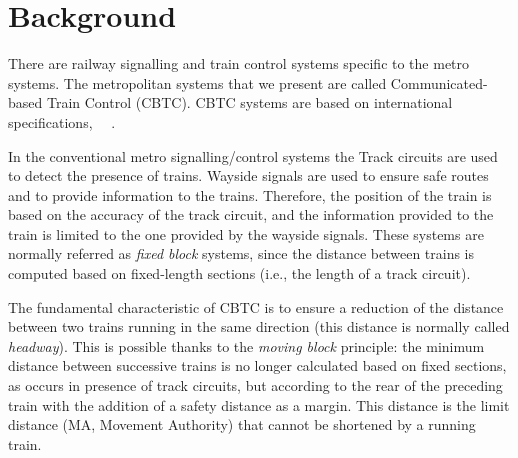 \documentclass{ewic}
\begin{document}
			\section{Background}\label{sec:back}
			
			There are railway signalling and train control systems specific to the metro systems. The metropolitan systems that we present are called Communicated-based Train Control (CBTC). CBTC systems are based on international specifications,~\cite{ieee1474} ~\cite{cei2007}.
			
			In the conventional metro signalling/control systems the Track circuits are used to detect the presence of trains. Wayside signals are used to ensure safe routes and to provide information to the trains. Therefore, the position of the train is based on the accuracy of the track circuit, and the information provided to the train is limited to the one provided by the wayside signals. These systems are normally referred as \emph{fixed block} systems, since the distance between trains is computed based on fixed-length sections (i.e., the length of a track circuit).
			
			
			The fundamental characteristic of CBTC is to ensure a reduction of the distance between two trains running in the same direction (this distance is normally called \emph{headway}). This is possible thanks to the \emph{moving block} principle: the minimum distance between successive trains is no longer calculated based on fixed sections, as occurs in presence of track circuits, but according to the rear of the preceding train with the addition of a safety distance as a margin. This distance is the limit distance (MA, Movement Authority) that cannot be shortened by a running train. 
			
\end{document}
